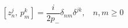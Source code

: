 \begin{equation}
\label{eq:open-zp-comm}
    \left[ z^j_n , \, p^k_m \right] =
    \frac{i}{2p_-} \delta_{nm} \delta^{jk}
    , \ \ \ \ n,m\geq 0
\end{equation}

